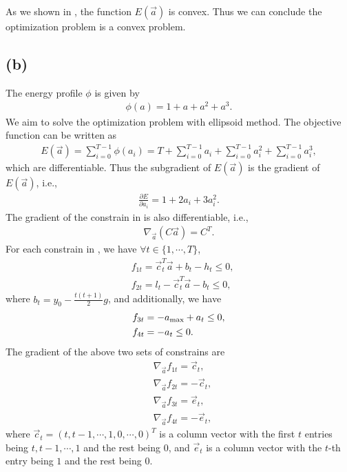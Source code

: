 \documentclass[letterpaper,10pt]{article}
\begin{document}
As we shown in , the function $E(\vec a)$ is convex.
Thus we can conclude the optimization problem is a convex problem.

\subsection*{(b)}

The energy profile $\phi$ is given by
\begin{align}
    \phi(a)=1+a+a^2+a^3.
\end{align}
We aim to solve the optimization problem with ellipsoid method.
The objective function can be written as
\begin{align}
    E(\vec a)=\sum_{i=0}^{T-1} \phi(a_i)=T+\sum_{i=0}^{T-1} a_i + \sum_{i=0}^{T-1} a_i^2 + \sum_{i=0}^{T-1} a_i^3,
\end{align}
which are differentiable.
Thus the subgradient of $E(\vec a)$ is the gradient of $E(\vec a)$, i.e.,
\begin{align}
    \frac{\partial E}{\partial a_i} = 1 + 2a_i + 3a_i^2.
\end{align}
The gradient of the constrain in  is also differentiable, i.e.,
\begin{align}
    \nabla_{\vec a} (C \vec a) = C^T.
\end{align}
For each constrain in , we have $\forall t\in \{1,\cdots,T\}$,
\begin{align}
    &f_{1t}=\vec c_t^T \vec a + b_t -h_t\le 0,\\
    &f_{2t}=l_t - \vec c_t^T \vec a - b_t\le 0,
\end{align}
where $b_t=y_0-\frac{t(t+1)}{2}g$, and additionally, we have
\begin{align}
    &f_{3t}=-a_{\rm max} + a_t \le 0,\\
    &f_{4t}=- a_t \le 0.
\end{align}
The gradient of the above two sets of constrains are
\begin{align}
    &\nabla_{\vec a} f_{1t}=\vec c_t,\\
    &\nabla_{\vec a} f_{2t}=-\vec c_t,\\
    &\nabla_{\vec a} f_{3t}=\vec e_t,\\
    &\nabla_{\vec a} f_{4t}=-\vec e_t,
\end{align}
where $\vec c_t=(t, t-1, \cdots, 1, 0, \cdots, 0)^T$ is a column vector with the first $t$ entries being $t, t-1, \cdots, 1$ and the rest being $0$, and $\vec e_t$ is a column vector with the $t$-th entry being $1$ and the rest being $0$.
\end{document}
